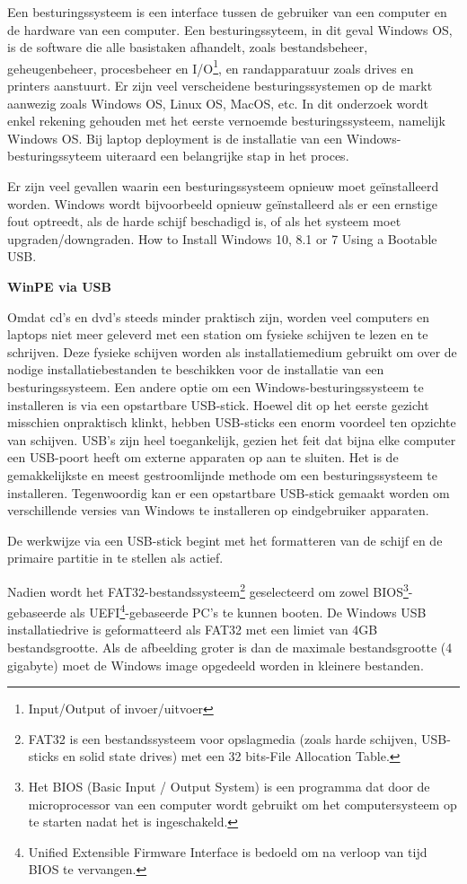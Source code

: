 Een besturingssysteem is een interface tussen de gebruiker van een computer en de hardware van een computer. Een besturingssyteem, in dit geval Windows OS, is de software die alle basistaken afhandelt, zoals bestandsbeheer, geheugenbeheer, procesbeheer en I/O\footnote{Input/Output of invoer/uitvoer}, en randapparatuur zoals drives en printers aanstuurt. Er zijn veel verscheidene besturingssystemen op de markt aanwezig zoals Windows OS, Linux OS, MacOS, etc.\autocite{tutorialspoint2022} In dit onderzoek wordt enkel rekening gehouden met het eerste vernoemde besturingssysteem, namelijk Windows OS. Bij laptop deployment is de installatie van een Windows-besturingssyteem uiteraard een belangrijke stap in het proces.

Er zijn veel gevallen waarin een besturingssysteem opnieuw moet geïnstalleerd worden. Windows wordt bijvoorbeeld opnieuw geïnstalleerd  als er een ernstige fout optreedt, als de harde schijf beschadigd is, of als het systeem moet upgraden/downgraden. How to Install Windows 10, 8.1 or 7 Using a Bootable USB.\autocite{softwarekeep2022}

\textbf{WinPE via USB}

Omdat cd's en dvd's steeds minder praktisch zijn, worden veel computers en laptops niet meer geleverd met een station om fysieke schijven te lezen en te schrijven. Deze fysieke schijven worden als installatiemedium gebruikt om over de nodige installatiebestanden te beschikken voor de installatie van een besturingssysteem. Een andere optie om een Windows-besturingssysteem te installeren is via een opstartbare USB-stick. Hoewel dit op het eerste gezicht misschien onpraktisch klinkt, hebben USB-sticks een enorm voordeel ten opzichte van schijven. USB's zijn heel toegankelijk, gezien het feit dat bijna elke computer een USB-poort heeft om externe apparaten op aan te sluiten. Het is de gemakkelijkste en meest gestroomlijnde methode om een besturingssysteem te installeren. Tegenwoordig kan er een opstartbare USB-stick gemaakt worden om verschillende versies van Windows te installeren op eindgebruiker apparaten.\autocite{softwarekeep2022}

De werkwijze via een USB-stick begint met het formatteren van de schijf en de primaire partitie in te stellen als actief.

Nadien wordt het FAT32-bestandssysteem\footnote{FAT32 is een bestandssysteem voor opslagmedia (zoals harde schijven, USB-sticks en solid state drives) met een 32 bits-File Allocation Table.} geselecteerd om zowel BIOS\footnote{Het BIOS (Basic Input / Output System) is een programma dat door de microprocessor van een computer wordt gebruikt om het computersysteem op te starten nadat het is ingeschakeld.}-gebaseerde als UEFI\footnote{Unified Extensible Firmware Interface is bedoeld om na verloop van tijd BIOS te vervangen.}-gebaseerde PC's te kunnen booten. De Windows USB installatiedrive is geformatteerd als FAT32 met een limiet van 4GB bestandsgrootte. Als de afbeelding groter is dan de maximale bestandsgrootte (4 gigabyte) moet de Windows image opgedeeld worden in kleinere bestanden.\autocite{EliotSeattle2021}

